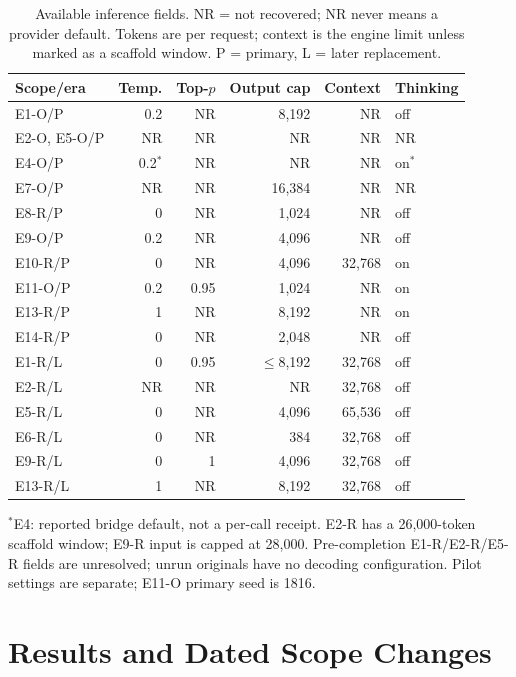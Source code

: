 \documentclass[a4paper,runningheads]{llncs}
\begin{document}
\begin{table}[t]
\caption{Available inference fields. NR = not recovered; NR never means a
provider default. Tokens are per request; context is the engine limit unless
marked as a scaffold window. P = primary, L = later replacement.}
\label{tab:inference}\centering\small\setlength{\tabcolsep}{3pt}
\begin{tabularx}{\textwidth}{@{}l r r r r Y@{}}\toprule
Scope/era & Temp. & Top-$p$ & Output cap & Context & Thinking \\\midrule
E1-O/P & 0.2 & NR & 8,192 & NR & off \\
E2-O, E5-O/P & NR & NR & NR & NR & NR \\
E4-O/P & 0.2$^*$ & NR & NR & NR & on$^*$ \\
E7-O/P & NR & NR & 16,384 & NR & NR \\
E8-R/P & 0 & NR & 1,024 & NR & off \\
E9-O/P & 0.2 & NR & 4,096 & NR & off \\
E10-R/P & 0 & NR & 4,096 & 32,768 & on \\
E11-O/P & 0.2 & 0.95 & 1,024 & NR & on \\
E13-R/P & 1 & NR & 8,192 & NR & on \\
E14-R/P & 0 & NR & 2,048 & NR & off \\\midrule
E1-R/L & 0 & 0.95 & $\leq$8,192 & 32,768 & off \\
E2-R/L & NR & NR & NR & 32,768 & off \\
E5-R/L & 0 & NR & 4,096 & 65,536 & off \\
E6-R/L & 0 & NR & 384 & 32,768 & off \\
E9-R/L & 0 & 1 & 4,096 & 32,768 & off \\
E13-R/L & 1 & NR & 8,192 & 32,768 & off \\\bottomrule
\end{tabularx}
\par\smallskip\footnotesize\raggedright
$^*$E4: reported bridge default, not a per-call receipt. E2-R has a
26,000-token scaffold window; E9-R input is capped at 28,000. Pre-completion
E1-R/E2-R/E5-R fields are unresolved; unrun originals have no decoding
configuration. Pilot settings are separate; E11-O primary seed is 1816.
\end{table}

\section{Results and Dated Scope Changes}
\end{document}
